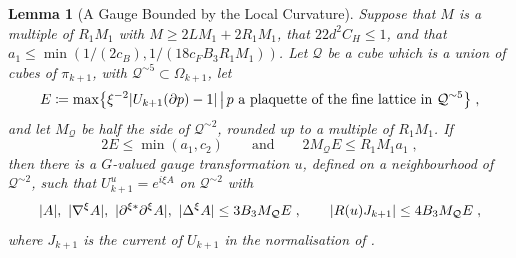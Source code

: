 \documentclass[11pt]{preprint}
\DeclarePairedDelimiter{\abs}{\lvert}{\rvert}
\numberwithin{equation}{section}
\newtheorem{lemma}{Lemma}[section]
\theoremstyle{definition}
\theoremstyle{remark}
\theoremstyle{plain}
\begin{document}
\begin{lemma}[A Gauge Bounded by the Local Curvature]\label{lem:local-gauge}
Suppose that $M$ is a multiple of $R_1M_1$ with $M \geq 2LM_1 + 2R_1M_1$, that $22d^2C_H \leq 1$, and that $a_1 \leq \min(1/(2c_B), 1/(18c_FB_3R_1M_1))$. Let $\mathcal Q$ be a cube which is a union of cubes of $\pi_{k+1}$, with $\mathcal Q^{\sim5} \subset \Omega_{k+1}$, let
\begin{equation}\label{eq:local-curvature}
    E \coloneqq \max\bigl\{ \xi^{-2}\abs{U_{k+1}(\partial p) - 1} \,\big|\, p \text{ a plaquette of the fine lattice in } \mathcal Q^{\sim5} \bigr\}\;,
\end{equation}
and let $M_{\mathcal Q}$ be half the side of $\mathcal Q^{\sim2}$, rounded up to a multiple of $R_1M_1$. If
\begin{equation}\label{eq:local-gauge-hypothesis}
    2E \leq \min(a_1, c_2)
    \qquad\text{and}\qquad
    2M_{\mathcal Q}E \leq R_1M_1a_1\;,
\end{equation}
then there is a $G$-valued gauge transformation $u$, defined on a neighbourhood of $\mathcal Q^{\sim2}$, such that $U_{k+1}^u = e^{i\xi A}$ on $\mathcal Q^{\sim2}$ with
\begin{equation}\label{eq:local-gauge}
    \abs A,\ \abs{\nabla^\xi A},\ \abs{\partial^{\xi*}\partial^\xi A},\ \abs{\Delta^\xi A} \leq 3B_3M_{\mathcal Q}E\;,
    \qquad
    \abs{R(u)J_{k+1}} \leq 4B_3M_{\mathcal Q}E\;,
\end{equation}
where $J_{k+1}$ is the current \cite[(1.8), p.~261]{BalabanRG1} of $U_{k+1}$ in the normalisation of \cite[(3.12), p.~272]{BalabanRG1}.
\end{lemma}
\end{document}

